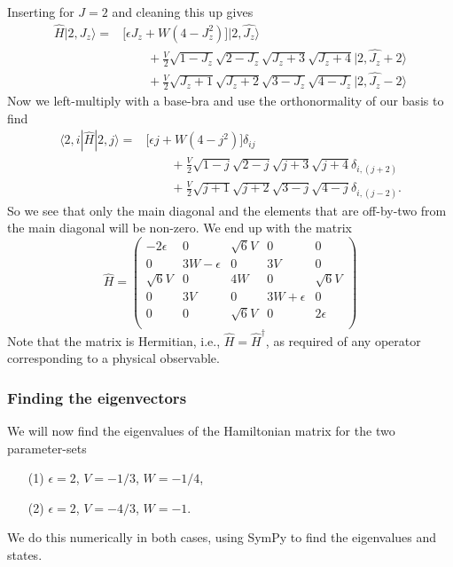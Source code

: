 \documentclass[a4paper, 11pt, notitlepage, english]{article}
\newcommand{\bra}[1]{\langle #1|}
\newcommand{\ket}[1]{|#1 \rangle}
\newcommand{\op}[1]{\hat{#1}}
\newcommand{\eps}{\epsilon}
\begin{document}
Inserting for $J=2$ and cleaning this up gives
\begin{align*}
\op{H}\ket{2, J_z} = &\big[\eps J_z + W(4-J_z^2)\big]\ket{2, \op{J_z}} \\&\qquad+
\frac{V}{2}\sqrt{1-J_z}\sqrt{2-J_z}\sqrt{J_z+3}\sqrt{J_z+4}\ket{2, \op{J_z}+2} \\&\qquad+
\frac{V}{2}\sqrt{J_z+1}\sqrt{J_z+2}\sqrt{3-J_z}\sqrt{4-J_z}\ket{2, \op{J_z}-2}
\end{align*}
Now we left-multiply with a base-bra and use the orthonormality of our basis to find
\begin{align*}
\bra{2, i}\op{H}\ket{2, j} = &\big[\eps j + W(4-j^2)\big]\delta_{ij} \\&\qquad+
\frac{V}{2}\sqrt{1-j}\sqrt{2-j}\sqrt{j+3}\sqrt{j+4}\delta_{i,(j+2)} \\&\qquad+
\frac{V}{2}\sqrt{j+1}\sqrt{j+2}\sqrt{3-j}\sqrt{4-j}\delta_{i,(j-2)}.
\end{align*}
So we see that only the main diagonal and the elements that are off-by-two from the main diagonal will be non-zero. We end up with the matrix
$$ \op{H} = 
\begin{pmatrix}
-2\eps & 0 & \sqrt{6}V & 0 & 0 \\
0 & 3W -\eps & 0 & 3V & 0 \\
\sqrt{6}V & 0 & 4W & 0 & \sqrt{6}V \\
0 & 3V & 0 & 3W+\eps & 0 \\
0 & 0 & \sqrt{6}V & 0 & 2\eps \\
\end{pmatrix}
$$
Note that the matrix is Hermitian, i.e., $\op{H} = \op{H}^\dagger$, as required of any operator corresponding to a physical observable.

\clearpage

\subsubsection*{Finding the eigenvectors}
We will now find the eigenvalues of the Hamiltonian matrix for the two parameter-sets
\begin{itemize}
	\item[(1)] $\eps = 2$, $V=-1/3$, $W=-1/4$,
	\item[(2)] $\eps = 2$, $V=-4/3$, $W=-1$.
\end{itemize}
We do this numerically in both cases, using SymPy to find the eigenvalues and states.
\end{document}
